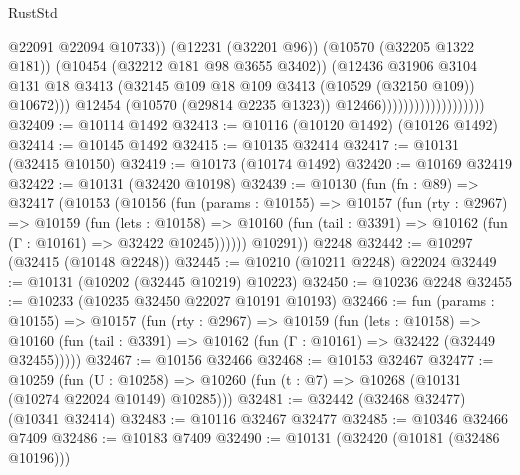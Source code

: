 \begin{lexlean}{RustStd}
\begin{coremodule}
                                                @22091
                                                @22094
                                                @10733))
                                            (@12231 (@32201 @96))
                                            (@10570 (@32205 @1322 @181))
                                            (@10454 (@32212 @181 @98 @3655 @3402))
                                            (@12436
                                              @31906
                                              @3104
                                              @131
                                              @18
                                              @3413
                                              (@32145
                                                @109
                                                @18
                                                @109
                                                @3413
                                                (@10529 (@32150 @109))
                                                @10672)))
                                          @12454
                                          (@10570 (@29814 @2235 @1323))
                                          @12466)))))))))))))))))))
@32409 := @10114 @1492
@32413 := @10116 (@10120 @1492) (@10126 @1492)
@32414 := @10145 @1492
@32415 := @10135 @32414
@32417 := @10131 (@32415 @10150)
@32419 := @10173 (@10174 @1492)
@32420 := @10169 @32419
@32422 := @10131 (@32420 @10198)
@32439 := @10130
    (fun (fn : @89) =>
    @32417
      (@10153
        (@10156
          (fun (params : @10155) =>
          @10157
            (fun (rty : @2967) =>
            @10159
              (fun (lets : @10158) =>
              @10160 (fun (tail : @3391) => @10162 (fun (Γ : @10161) => @32422 @10245))))))
        @10291))
    @2248
@32442 := @10297 (@32415 (@10148 @2248))
@32445 := @10210 (@10211 @2248) @22024
@32449 := @10131 (@10202 (@32445 @10219) @10223)
@32450 := @10236 @2248
@32455 := @10233 (@10235 @32450 @22027 @10191 @10193)
@32466 := fun (params : @10155) =>
  @10157
    (fun (rty : @2967) =>
    @10159
      (fun (lets : @10158) =>
      @10160 (fun (tail : @3391) => @10162 (fun (Γ : @10161) => @32422 (@32449 @32455)))))
@32467 := @10156 @32466
@32468 := @10153 @32467
@32477 := @10259
    (fun (U : @10258) => @10260 (fun (t : @7) => @10268 (@10131 (@10274 @22024 @10149) @10285)))
@32481 := @32442 (@32468 @32477) (@10341 @32414)
@32483 := @10116 @32467 @32477
@32485 := @10346 @32466 @7409
@32486 := @10183 @7409
@32490 := @10131 (@32420 (@10181 (@32486 @10196)))

\end{coremodule}
\end{lexlean}
